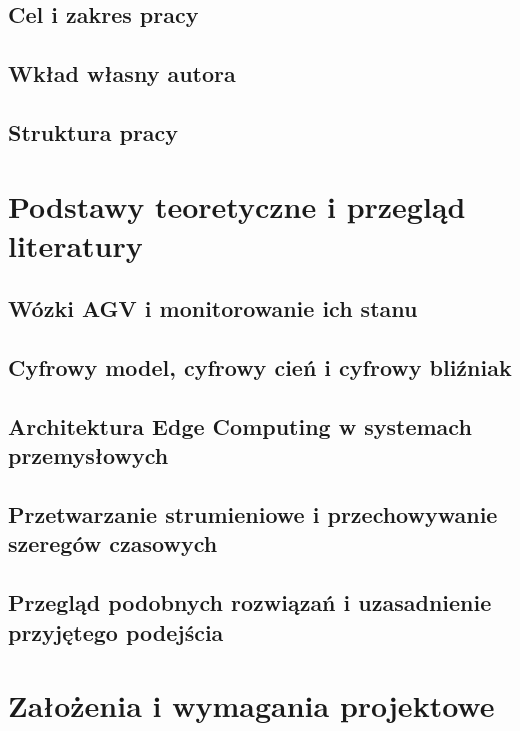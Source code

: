 \documentclass[11pt,a4paper]{report}
\begin{document}
\section{Cel i zakres pracy}
\section{Wkład własny autora}
\section{Struktura pracy}

\chapter{Podstawy teoretyczne i przegląd literatury}
\section{Wózki AGV i monitorowanie ich stanu}
\section{Cyfrowy model, cyfrowy cień i cyfrowy bliźniak}
\section{Architektura Edge Computing w systemach przemysłowych}
\section{Przetwarzanie strumieniowe i przechowywanie szeregów czasowych}
\section{Przegląd podobnych rozwiązań i uzasadnienie przyjętego podejścia}

\chapter{Założenia i wymagania projektowe}
\end{document}

